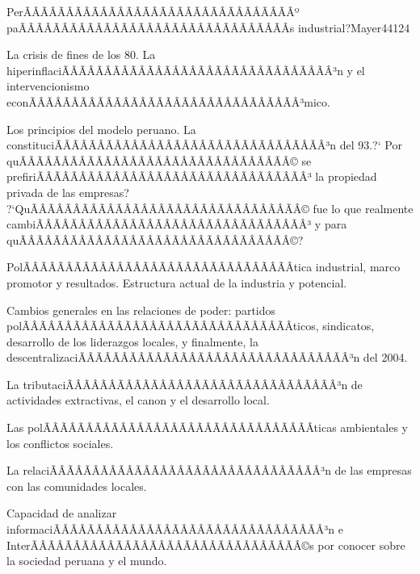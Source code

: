 \begin{syllabus}
\begin{unit}{PerÃÂÃÂÃÂÃÂÃÂÃÂÃÂÃÂÃÂÃÂÃÂÃÂÃÂÃÂÃÂÃÂº paÃÂÃÂÃÂÃÂÃÂÃÂÃÂÃÂÃÂÃÂÃÂÃÂÃÂÃÂÃÂÃÂ­s industrial?}{}{Mayer44}{12}{4}
\begin{topics}
      \item La crisis de fines de los 80. La hiperinflaciÃÂÃÂÃÂÃÂÃÂÃÂÃÂÃÂÃÂÃÂÃÂÃÂÃÂÃÂÃÂÃÂ³n y el intervencionismo econÃÂÃÂÃÂÃÂÃÂÃÂÃÂÃÂÃÂÃÂÃÂÃÂÃÂÃÂÃÂÃÂ³mico.
      \item Los principios del modelo peruano. La constituciÃÂÃÂÃÂÃÂÃÂÃÂÃÂÃÂÃÂÃÂÃÂÃÂÃÂÃÂÃÂÃÂ³n del 93.?` Por quÃÂÃÂÃÂÃÂÃÂÃÂÃÂÃÂÃÂÃÂÃÂÃÂÃÂÃÂÃÂÃÂ© se prefiriÃÂÃÂÃÂÃÂÃÂÃÂÃÂÃÂÃÂÃÂÃÂÃÂÃÂÃÂÃÂÃÂ³ la propiedad privada de las empresas? ?`QuÃÂÃÂÃÂÃÂÃÂÃÂÃÂÃÂÃÂÃÂÃÂÃÂÃÂÃÂÃÂÃÂ© fue lo que realmente cambiÃÂÃÂÃÂÃÂÃÂÃÂÃÂÃÂÃÂÃÂÃÂÃÂÃÂÃÂÃÂÃÂ³ y para quÃÂÃÂÃÂÃÂÃÂÃÂÃÂÃÂÃÂÃÂÃÂÃÂÃÂÃÂÃÂÃÂ©?
      \item PolÃÂÃÂÃÂÃÂÃÂÃÂÃÂÃÂÃÂÃÂÃÂÃÂÃÂÃÂÃÂÃÂ­tica industrial, marco promotor y resultados. Estructura actual de la industria y potencial.
      \item Cambios generales en las relaciones de poder: partidos polÃÂÃÂÃÂÃÂÃÂÃÂÃÂÃÂÃÂÃÂÃÂÃÂÃÂÃÂÃÂÃÂ­ticos, sindicatos, desarrollo de los liderazgos locales, y finalmente, la descentralizaciÃÂÃÂÃÂÃÂÃÂÃÂÃÂÃÂÃÂÃÂÃÂÃÂÃÂÃÂÃÂÃÂ³n del 2004.
      \item La tributaciÃÂÃÂÃÂÃÂÃÂÃÂÃÂÃÂÃÂÃÂÃÂÃÂÃÂÃÂÃÂÃÂ³n de actividades extractivas, el canon y el desarrollo local.
      \item Las polÃÂÃÂÃÂÃÂÃÂÃÂÃÂÃÂÃÂÃÂÃÂÃÂÃÂÃÂÃÂÃÂ­ticas ambientales y los conflictos sociales.
      \item La relaciÃÂÃÂÃÂÃÂÃÂÃÂÃÂÃÂÃÂÃÂÃÂÃÂÃÂÃÂÃÂÃÂ³n de las empresas con las comunidades locales.
   \end{topics}
   \begin{learningoutcomes}
      \item Capacidad de analizar informaciÃÂÃÂÃÂÃÂÃÂÃÂÃÂÃÂÃÂÃÂÃÂÃÂÃÂÃÂÃÂÃÂ³n e InterÃÂÃÂÃÂÃÂÃÂÃÂÃÂÃÂÃÂÃÂÃÂÃÂÃÂÃÂÃÂÃÂ©s por conocer sobre la sociedad peruana y el mundo.
   \end{learningoutcomes}
\end{unit}



\begin{coursebibliography}
\end{coursebibliography}

\end{syllabus}
